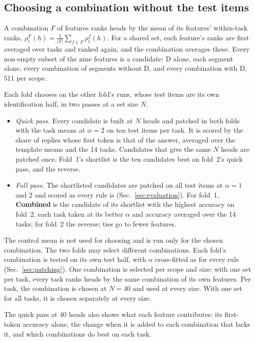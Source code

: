 \documentclass[10pt,a4paper]{article}
\begin{document}
\subsection{Choosing a combination without the test items}\label{sec:select}

A combination $F$ of features ranks heads by the mean of its features' within-task ranks, $\rho^F_t(h) = \frac{1}{|F|}\sum_{f\in F}\rho^f_t(h)$. For a shared set, each feature's ranks are first averaged over tasks and ranked again, and the combination averages these. Every non-empty subset of the nine features is a candidate: D alone, each segment alone, every combination of segments without D, and every combination with D, 511 per scope.

Each fold chooses on the other fold's runs, whose test items are its own identification half, in two passes at a set size $N$.
\begin{itemize}
\item \emph{Quick pass.} Every candidate is built at $N$ heads and patched in both folds with the task means at $\alpha=2$ on ten test items per task. It is scored by the share of replies whose first token is that of the answer, averaged over the template means and the 14 tasks. Candidates that give the same $N$ heads are patched once. Fold~1's shortlist is the ten candidates best on fold~2's quick pass, and the reverse.
\item \emph{Full pass.} The shortlisted candidates are patched on all test items at $\alpha=1$ and $2$ and scored as every rule is (Sec.~\ref{sec:evaluation}). For fold~1, \textbf{Combined} is the candidate of its shortlist with the highest accuracy on fold~2, each task taken at its better $\alpha$ and accuracy averaged over the 14 tasks; for fold~2 the reverse; ties go to fewer features.
\end{itemize}
The control mean is not used for choosing and is run only for the chosen combination. The two folds may select different combinations. Each fold's combination is tested on its own test half, with $\alpha$ cross-fitted as for every rule (Sec.~\ref{sec:patching}). One combination is selected per scope and size: with one set per task, every task ranks heads by the same combination of its own features. Per task, the combination is chosen at $N=40$ and used at every size. With one set for all tasks, it is chosen separately at every size.

The quick pass at 40 heads also shows what each feature contributes: its first-token accuracy alone, the change when it is added to each combination that lacks it, and which combinations do best on each task.
\end{document}
